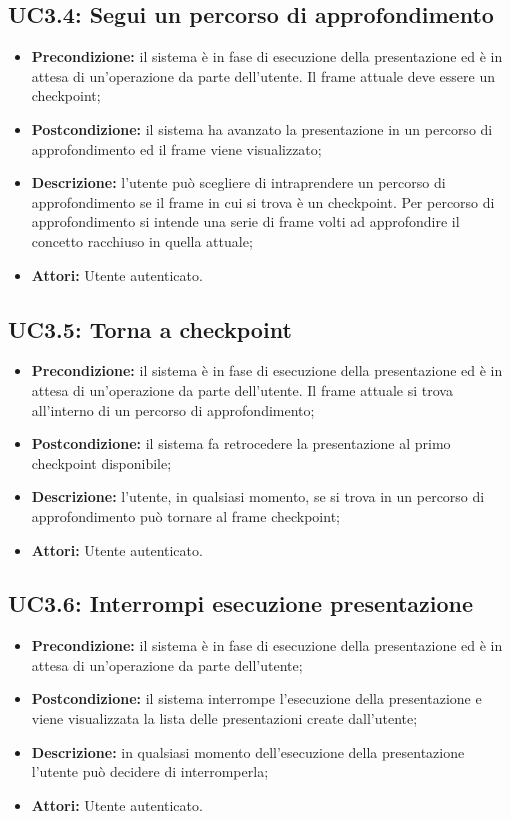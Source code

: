\subsection{ UC3.4: Segui un percorso di approfondimento}

\begin{itemize}
	\item \textbf{Precondizione:} il sistema è in fase di esecuzione della presentazione ed è in attesa di un'operazione da parte dell'utente. Il frame attuale deve essere un checkpoint;
	\item \textbf{Postcondizione:} il sistema ha avanzato la presentazione in un percorso di approfondimento ed il frame viene visualizzato;
	\item \textbf{Descrizione:} l'utente può scegliere di intraprendere un percorso di approfondimento se il frame in cui si trova è un checkpoint. Per percorso di approfondimento si intende una serie di frame volti ad approfondire il concetto racchiuso in quella attuale;
	\item \textbf{Attori:} Utente autenticato.
\end{itemize}
\subsection{ UC3.5: Torna a checkpoint}

\begin{itemize}
	\item \textbf{Precondizione:} il sistema è in fase di esecuzione della presentazione ed è in attesa di un'operazione da parte dell'utente. Il frame attuale si trova all'interno di un percorso di approfondimento;
	\item \textbf{Postcondizione:} il sistema fa retrocedere la presentazione al primo checkpoint disponibile;
	\item \textbf{Descrizione:} l'utente, in qualsiasi momento, se si trova in un percorso di approfondimento può tornare al frame checkpoint;
	\item \textbf{Attori:} Utente autenticato.
\end{itemize}
\subsection{ UC3.6: Interrompi esecuzione presentazione}

\begin{itemize}
	\item \textbf{Precondizione:} il sistema è in fase di esecuzione della presentazione ed è in attesa di un'operazione da parte dell'utente;
	\item \textbf{Postcondizione:} il sistema interrompe l'esecuzione della presentazione e viene visualizzata la lista delle presentazioni create dall'utente;
	\item \textbf{Descrizione:} in qualsiasi momento dell'esecuzione della presentazione l'utente può decidere di interromperla;
	\item \textbf{Attori:} Utente autenticato.
\end{itemize}
